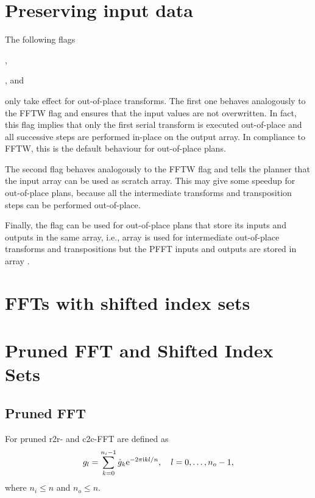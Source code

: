 \section{Preserving input data}
The following flags
\begin{compactitem}
  \item {},
  \item {}, and
  \item {}
\end{compactitem}
only take effect for out-of-place transforms.
The first one behaves analogously to the FFTW flag  and ensures that the input values are not overwritten.
In fact, this flag implies that only the first serial transform is executed out-of-place and all
successive steps are performed in-place on the output array.
In compliance to FFTW, this is the default behaviour for out-of-place plans.

The second flag behaves analogously to the FFTW flag  and tells the planner that
the input array can be used as scratch array. This may give some speedup for out-of-place plans,
because all the intermediate transforms and transposition steps can be performed out-of-place.

Finally, the flag  can be used for out-of-place plans that store its inputs and outputs in the same array,
i.e., array  is used for intermediate out-of-place transforms and transpositions but the PFFT inputs and outputs are stored in array .


\section{FFTs with shifted index sets}
\begin{compactitem}
  \item {}
  \item {}
\end{compactitem}

\section{Pruned FFT and Shifted Index Sets}
\subsection{Pruned FFT}
For pruned r2r- and c2c-FFT are defined as
\begin{equation*}
  g_l = \sum_{k=0}^{n_i-1} \hat g_k \mathrm{e}^{-2\pi{\ensuremath{\text{\scriptsize{i}}}} kl/n}, \quad l=0,\hdots,n_o-1,
\end{equation*}
where $n_i\le n$ and $n_o\le n$.

